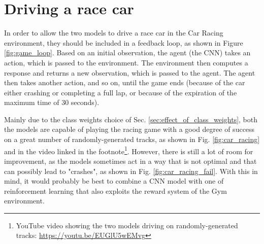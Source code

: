 \section{Driving a race car}
\label{sec:driving_race_car}
In order to allow the two models to drive a race car in the Car Racing environment, they should be included in a feedback loop, as shown in Figure \ref{fig:game_loop}. Based on an initial observation, the agent (the CNN) takes an action, which is passed to the environment. The environment then computes a response and returns a new observation, which is passed to the agent. The agent then takes another action, and so on, until the game ends (because of the car either crashing or completing a full lap, or because of the expiration of the maximum time of 30 seconds).



\noindent Mainly due to the class weights choice of Sec. \ref{sec:effect_of_class_weights}, both the models are capable of playing the racing game with a good degree of success on a great number of randomly-generated tracks, as shown in Fig. \ref{fig:car_racing} and in the video linked in the footnote\footnote{YouTube video showing the two models driving on randomly-generated tracks: \url{https://youtu.be/EUGlU5wEMvg}}. However, there is still a lot of room for improvement, as the models sometimes act in a way that is not optimal and that can possibly lead to "crashes", as shown in Fig. \ref{fig:car_racing_fail}. With this in mind, it would probably be best to combine a CNN model with one of reinforcement learning that also exploits the reward system of the Gym environment.






